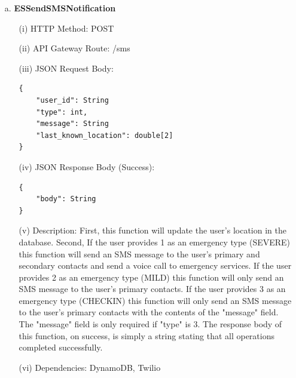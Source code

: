 \documentclass[10pt, a4paper]{article}
\begin{document}
	\pagebreak
	\begin{enumerate}
	\item[a.] \textbf{ESSendSMSNotification}
		\begin{itemize}		
		\item[(i)] HTTP Method: POST
		\item[(ii)] API Gateway Route: /sms
		\item[(iii)] JSON Request Body:
			\begin{lstlisting}
{
	"user_id": String
	"type": int,
	"message": String
	"last_known_location": double[2]
}
			\end{lstlisting}
		\item[(iv)] JSON Response Body (Success):
			\begin{lstlisting}
{
	"body": String
}
			\end{lstlisting}
		\item[(v)] Description: First, this function will update the user's location in the database. Second, If the user provides 1 as an emergency type (SEVERE) this function will send an SMS message to the user's primary and secondary contacts and send a voice call to emergency services. If the user provides 2 as an emergency type (MILD) this function will only send an SMS message to the user's primary contacts. If the user provides 3 as an emergency type (CHECKIN) this function will only send an SMS message to the user's primary contacts with the contents of the "message" field. The "message" field is only required if "type" is 3. The response body of this function, on success, is simply a string stating that all operations completed successfully.
		\item[(vi)] Dependencies: DynamoDB, Twilio
		\end{itemize}
		

\end{enumerate}
\end{document}
